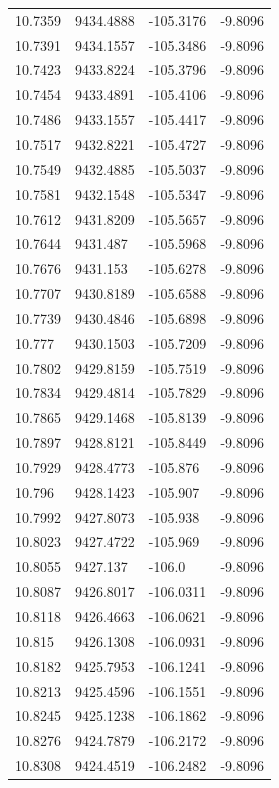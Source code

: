 \begin{table}[H]
\begin{tabular}{llll}
10.7359 & 9434.4888 & -105.3176 & -9.8096 \\
10.7391 & 9434.1557 & -105.3486 & -9.8096 \\
10.7423 & 9433.8224 & -105.3796 & -9.8096 \\
10.7454 & 9433.4891 & -105.4106 & -9.8096 \\
10.7486 & 9433.1557 & -105.4417 & -9.8096 \\
10.7517 & 9432.8221 & -105.4727 & -9.8096 \\
10.7549 & 9432.4885 & -105.5037 & -9.8096 \\
10.7581 & 9432.1548 & -105.5347 & -9.8096 \\
10.7612 & 9431.8209 & -105.5657 & -9.8096 \\
10.7644 & 9431.487 & -105.5968 & -9.8096 \\
10.7676 & 9431.153 & -105.6278 & -9.8096 \\
10.7707 & 9430.8189 & -105.6588 & -9.8096 \\
10.7739 & 9430.4846 & -105.6898 & -9.8096 \\
10.777 & 9430.1503 & -105.7209 & -9.8096 \\
10.7802 & 9429.8159 & -105.7519 & -9.8096 \\
10.7834 & 9429.4814 & -105.7829 & -9.8096 \\
10.7865 & 9429.1468 & -105.8139 & -9.8096 \\
10.7897 & 9428.8121 & -105.8449 & -9.8096 \\
10.7929 & 9428.4773 & -105.876 & -9.8096 \\
10.796 & 9428.1423 & -105.907 & -9.8096 \\
10.7992 & 9427.8073 & -105.938 & -9.8096 \\
10.8023 & 9427.4722 & -105.969 & -9.8096 \\
10.8055 & 9427.137 & -106.0 & -9.8096 \\
10.8087 & 9426.8017 & -106.0311 & -9.8096 \\
10.8118 & 9426.4663 & -106.0621 & -9.8096 \\
10.815 & 9426.1308 & -106.0931 & -9.8096 \\
10.8182 & 9425.7953 & -106.1241 & -9.8096 \\
10.8213 & 9425.4596 & -106.1551 & -9.8096 \\
10.8245 & 9425.1238 & -106.1862 & -9.8096 \\
10.8276 & 9424.7879 & -106.2172 & -9.8096 \\
10.8308 & 9424.4519 & -106.2482 & -9.8096 \\

\end{tabular}
\end{table}
